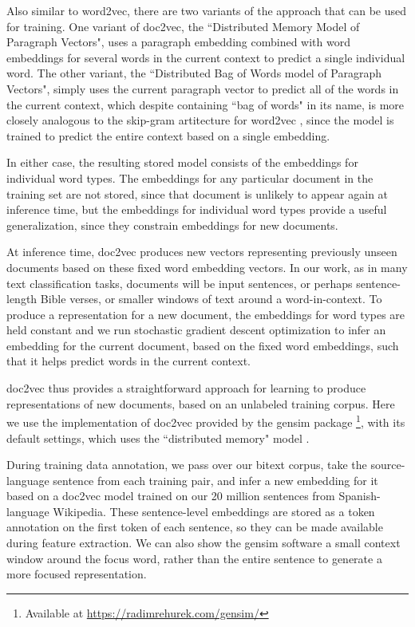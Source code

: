 Also similar to word2vec, there are two variants of the approach that can be
used for training. One variant of doc2vec, the ``Distributed Memory Model of
Paragraph Vectors", uses a paragraph embedding combined with word embeddings
for several words in the current context to predict a single individual word.
The other variant, the ``Distributed Bag of Words model of Paragraph Vectors",
simply uses the current paragraph vector to predict all of the words in the
current context, which despite containing ``bag of words" in its name, is more
closely analogous to the skip-gram artitecture for word2vec
\cite{quocle-distributed-representations-2014}, since the model is trained to
predict the entire context based on a single embedding.

In either case, the resulting stored model consists of the embeddings for
individual word types. The embeddings for any particular document in the
training set are not stored, since that document is unlikely to appear again at
inference time, but the embeddings for individual word types provide a useful
generalization, since they constrain embeddings for new documents.

At inference time, doc2vec produces new vectors representing previously unseen
documents based on these fixed word embedding vectors. In our work, as in many
text classification tasks, documents will be input sentences, or perhaps
sentence-length Bible verses, or smaller windows of text around a
word-in-context. To produce a representation for a new document, the embeddings
for word types are held constant and we run stochastic gradient descent
optimization to infer an embedding for the current document, based on the fixed
word embeddings, such that it helps predict words in the current context.

doc2vec thus provides a straightforward approach for learning to produce
representations of new documents, based on an unlabeled training corpus. Here
we use the implementation of doc2vec provided by the gensim package
\footnote{Available at \url{https://radimrehurek.com/gensim/}}, with its
default settings, which uses the ``distributed memory" model
\cite{rehurek-lrec}.

During training data annotation, we pass over our bitext corpus, take the
source-language sentence from each training pair, and infer a new embedding for
it based on a doc2vec model trained on our 20 million sentences from
Spanish-language Wikipedia. These sentence-level embeddings are stored as a
token annotation on the first token of each sentence, so they can be made
available during feature extraction. We can also show the gensim software a
small context window around the focus word, rather than the entire sentence to
generate a more focused representation.

